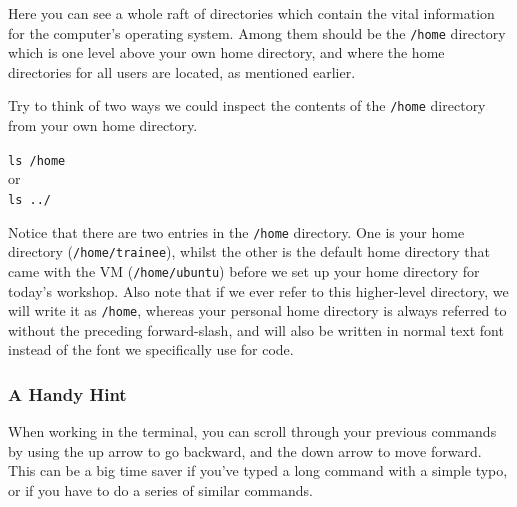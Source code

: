 \documentclass[a4paper,12pt,twoside]{memoir}
\begin{document}
Here you can see a whole raft of directories which contain the vital information for the computer's operating system.
Among them should be the \texttt{/home} directory which is one level above your own home directory, and where the home directories for all users are located, as mentioned earlier.\\

\begin{questions}
Try to think of two ways we could inspect the contents of the \texttt{/home} directory from your own home directory. \\
\begin{answer}
\texttt{ls /home} \\
or \\
\texttt{ls ../} \\
\end{answer}
\end{questions}

\begin{note}
Notice that there are two entries in the \texttt{/home} directory. 
One is your home directory (\texttt{/home/trainee}), whilst the other is the default home directory that came with the VM (\texttt{/home/ubuntu}) before we set up your home directory for today's workshop.
Also note that if we ever refer to this higher-level directory, we will write it as \texttt{/home}, whereas your personal home directory is always referred to without the preceding forward-slash, and will also be written in normal text font instead of the font we specifically use for code. \\
\end{note}

\subsubsection*{A Handy Hint}
\begin{information}
When working in the terminal, you can scroll through your previous commands by using the up arrow to go backward, and the down arrow to move forward.
This can be a big time saver if you've typed a long command with a simple typo, or if you have to do a series of similar commands.
\end{information}
\end{document}

